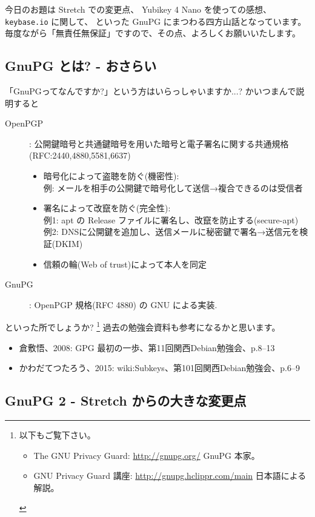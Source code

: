 \documentclass[mingoth,a4paper]{jsarticle}
\begin{document}
今日のお題は
Stretch での変更点、
Yubikey 4 Nano を使っての感想、
\texttt{keybase.io} に関して、
といった GnuPG にまつわる四方山話となっています。
毎度ながら「無責任無保証」ですので、その点、よろしくお願いいたします。

\subsection{GnuPG とは? - おさらい}

「GnuPGってなんですか?」という方はいらっしゃいますか...?
かいつまんで説明すると
\begin{description}
\item[OpenPGP]: %
  公開鍵暗号と共通鍵暗号を用いた暗号と電子署名に関する共通規格
  (RFC:2440,4880,5581,6637)
  \begin{itemize}
  \item %
    暗号化によって盗聴を防ぐ(機密性): \\
    例: メールを相手の公開鍵で暗号化して送信→複合できるのは受信者
  \item %
    署名によって改竄を防ぐ(完全性): \\
    例1: apt の Release ファイルに署名し、改竄を防止する(secure-apt) \\
    例2: DNSに公開鍵を追加し、送信メールに秘密鍵で署名→送信元を検証(DKIM)
  \item %
    信頼の輪(Web of trust)によって本人を同定
  \end{itemize}
\item[GnuPG]: %
  OpenPGP 規格(RFC 4880) の GNU による実装.
\end{description}
といった所でしょうか?
\footnote{
  以下もご覧下さい。
  \begin{itemize}
  \item %
    The GNU Privacy Guard: \url{http://gnupg.org/}
    GnuPG 本家。
  \item %
    GNU Privacy Guard 講座: \url{http://gnupg.hclippr.com/main}
    日本語による解説。
  \end{itemize}
}
過去の勉強会資料も参考になるかと思います。
\begin{itemize}
\item 倉敷悟、2008: GPG 最初の一歩、第11回関西Debian勉強会、p.8--13
\item かわだてつたろう、2015: wiki:Subkeys、第101回関西Debian勉強会、p.6--9
\end{itemize}

\subsection{GnuPG 2 - Stretch からの大きな変更点}
\end{document}
